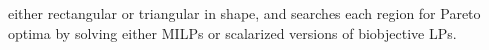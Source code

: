 \documentclass[11.5pt]{article}
\begin{document}
either rectangular or triangular in shape, and searches each region for Pareto optima by solving either MILPs or scalarized versions of biobjective LPs.   








  

\end{document}
